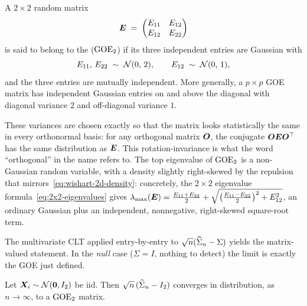 \begin{definition}\label{def:goe}
A \(2 \times 2\) random matrix
\[
  \bm{E} \;=\; \begin{pmatrix} E_{11} & E_{12} \\ E_{12} & E_{22} \end{pmatrix}
\]
is said to belong to the  (\(\mathrm{GOE}_2\)) if its three independent entries are Gaussian with
\[
  E_{11},\, E_{22} \;\sim\; \mathcal{N}(0,\, 2), \qquad E_{12} \;\sim\; \mathcal{N}(0,\, 1),
\]
and the three entries are mutually independent. More generally, a \(p \times p\) GOE matrix has independent Gaussian entries on and above the diagonal with diagonal variance \(2\) and off-diagonal variance \(1\).
\end{definition}

These variances are chosen exactly so that the matrix looks statistically the same in every orthonormal basis: for any orthogonal matrix \(\bm{O}\), the conjugate \(\bm{O} \bm{E} \bm{O}^{\top}\) has the same distribution as \(\bm{E}\). This rotation-invariance is what the word ``orthogonal'' in the name refers to. The top eigenvalue of \(\mathrm{GOE}_2\) is a non-Gaussian random variable, with a density slightly right-skewed by the repulsion that mirrors~\eqref{eq:wishart-2d-density}: concretely, the \(2 \times 2\) eigenvalue formula~\eqref{eq:2x2-eigenvalues} gives \(\lambda_{\max}(\bm{E}) = \tfrac{E_{11} + E_{22}}{2} + \sqrt{\bigl(\tfrac{E_{11} - E_{22}}{2}\bigr)^2 + E_{12}^2}\), an ordinary Gaussian plus an independent, nonnegative, right-skewed square-root term.

The multivariate CLT applied entry-by-entry to \(\sqrt{n}(\widehat{\Sigma}_n - \Sigma)\) yields the matrix-valued statement. In the \emph{null} case (\(\Sigma = I\), nothing to detect) the limit is exactly the GOE just defined.

\begin{proposition}[Matrix-valued CLT for \(\Sigma = I_2\)]\label{prop:matrix-clt-I2}
Let \(\bm{X}_i \sim \mathcal{N}(\bm{0}, I_2)\) be iid. Then \(\sqrt{n}\,(\widehat{\Sigma}_n - I_2)\) converges in distribution, as \(n \to \infty\), to a \(\mathrm{GOE}_2\) matrix.
\end{proposition}

